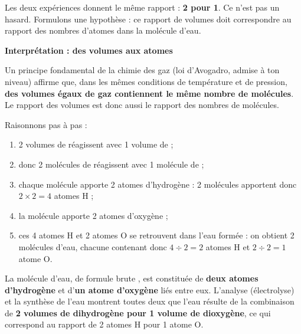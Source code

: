 \documentclass[11pt]{article}
\newcommand{\cle}[1]{{\popxbold\color{popdark}#1}}
\begin{document}
Les deux expériences donnent le même rapport : \textbf{2 pour 1}. Ce n'est pas un hasard. Formulons une hypothèse : ce rapport de volumes doit correspondre au rapport des nombres d'atomes dans la molécule d'eau.

\textbf{Interprétation : des volumes aux atomes}\par

Un principe fondamental de la chimie des gaz (loi d'Avogadro, admise à ton niveau) affirme que, dans les mêmes conditions de température et de pression, \textbf{des volumes égaux de gaz contiennent le même nombre de molécules}. Le rapport des volumes est donc aussi le rapport des nombres de molécules.

Raisonnons pas à pas :
\begin{enumerate}
\item 2 volumes de  réagissent avec 1 volume de  ;
\item donc 2 molécules de  réagissent avec 1 molécule de  ;
\item chaque molécule  apporte 2 atomes d'hydrogène : 2 molécules  apportent donc $2 \times 2 = 4$ atomes H ;
\item la molécule  apporte 2 atomes d'oxygène ;
\item ces 4 atomes H et 2 atomes O se retrouvent dans l'eau formée : on obtient 2 molécules d'eau, chacune contenant donc $4 \div 2 = 2$ atomes H et $2 \div 2 = 1$ atome O.
\end{enumerate}

\begin{propriete}
La molécule d'eau, de \cle{formule brute} , est constituée de \textbf{deux atomes d'hydrogène} et d'\textbf{un atome d'oxygène} liés entre eux. L'analyse (électrolyse) et la synthèse de l'eau montrent toutes deux que l'eau résulte de la combinaison de \textbf{2 volumes de dihydrogène pour 1 volume de dioxygène}, ce qui correspond au rapport de 2 atomes H pour 1 atome O.
\end{propriete}
\end{document}
